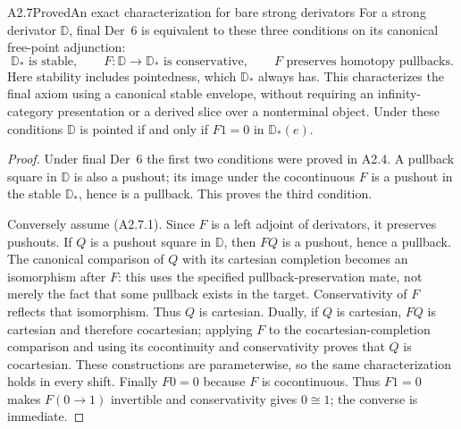 \begin{claim}{A2.7}{Proved}{An exact characterization for bare strong derivators}
\label{A2-bare-characterization}
For a strong derivator $\mathbb D$, final Der~6 is equivalent to these three
conditions on its canonical free-point adjunction:
\[
 \mathbb D_*\text{ is stable},\qquad
 F:\mathbb D\to\mathbb D_*\text{ is conservative},\qquad
 F\text{ preserves homotopy pullbacks}.
 \tag{A2.7.1}
\]
Here stability includes pointedness, which $\mathbb D_*$ always has.
This characterizes the final axiom using a canonical stable envelope, without
requiring an infinity-category presentation or a derived slice over a
nonterminal object. Under these conditions $\mathbb D$ is pointed if and
only if $F1=0$ in $\mathbb D_*(e)$.
\end{claim}
\begin{proof}
Under final Der~6 the first two conditions were proved in A2.4. A pullback
square in $\mathbb D$ is also a pushout; its image under the cocontinuous
$F$ is a pushout in the stable $\mathbb D_*$, hence is a pullback. This proves
the third condition.

Conversely assume (A2.7.1). Since $F$ is a left adjoint of derivators, it
preserves pushouts. If $Q$ is a pushout square in $\mathbb D$, then $FQ$ is
a pushout, hence a pullback. The canonical comparison of $Q$ with its
cartesian completion becomes an isomorphism after $F$: this uses the
specified pullback-preservation mate, not merely the fact that some pullback
exists in the target. Conservativity of $F$ reflects that isomorphism.
Thus $Q$ is cartesian. Dually, if $Q$ is cartesian, $FQ$ is cartesian and
therefore cocartesian; applying $F$ to the cocartesian-completion comparison
and using its cocontinuity and conservativity proves that $Q$ is cocartesian.
These constructions are parameterwise, so the same characterization holds
in every shift.
Finally $F0=0$ because $F$ is cocontinuous. Thus $F1=0$ makes
$F(0\to1)$ invertible and conservativity gives $0\cong1$; the converse is
immediate.
\end{proof}

